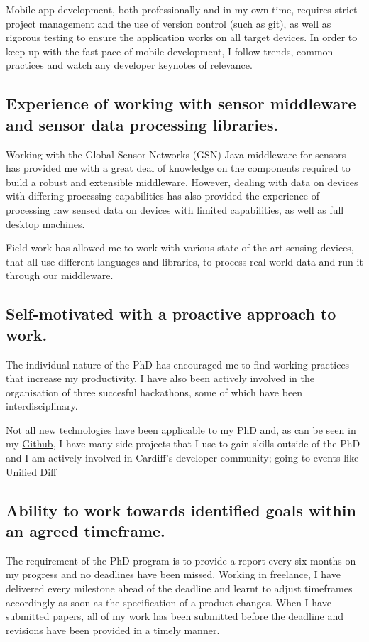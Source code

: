 \documentclass[10pt,a4paper]{article}
\begin{document}
Mobile app development, both professionally and in my own time, requires strict project management and the use of version control (such as git), as well as rigorous testing to ensure the application works on all target devices. In order to keep up with the fast pace of mobile development, I follow trends, common practices and watch any developer keynotes of relevance.

\subsection{Experience of working with sensor middleware and sensor data processing libraries.}
Working with the Global Sensor Networks (GSN) Java middleware for sensors has provided me with a great deal of knowledge on the components required to build a robust and extensible middleware. However, dealing with data on devices with differing processing capabilities has also provided the experience of processing raw sensed data on devices with limited capabilities, as well as full desktop machines.

Field work has allowed me to work with various state-of-the-art sensing devices, that all use different languages and libraries, to process real world data and run it through our middleware.

\subsection{Self-motivated with a proactive approach to work.}
The individual nature of the PhD has encouraged me to find working practices that increase my productivity. I have also been actively involved in the organisation of three succesful hackathons, some of which have been interdisciplinary.

Not all new technologies have been applicable to my PhD and, as can be seen in my \href{http://github.com/encima/}{Github}, I have many side-projects that I use to gain skills outside of the PhD and I am actively involved in Cardiff's developer community; going to events like  \href{http://unifieddiff.co.uk}{Unified Diff} \\

\subsection{Ability to work towards identified goals within an agreed timeframe.}
The requirement of the PhD program is to provide a report every six months on my progress and no deadlines have been missed. Working in freelance, I have delivered every milestone ahead of the deadline and learnt to adjust timeframes accordingly as soon as the specification of a product changes. When I have submitted papers, all of my work has been submitted before the deadline and revisions have been provided in a timely manner.
\end{document}
